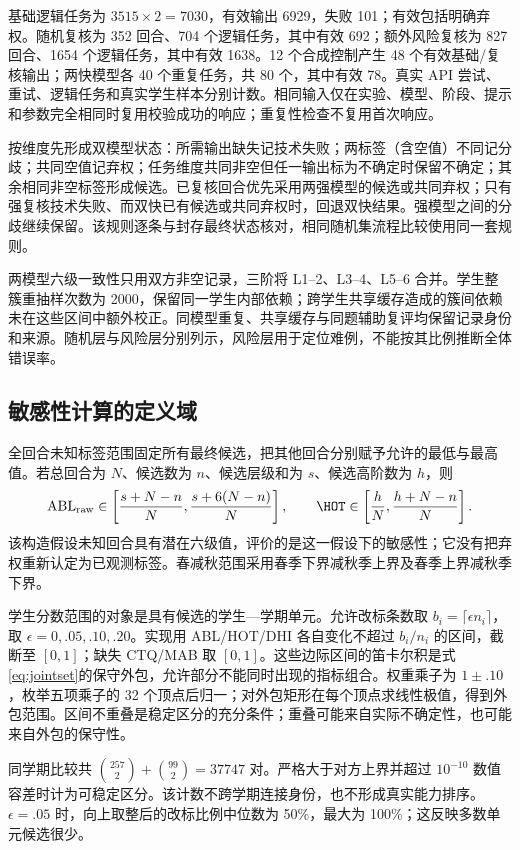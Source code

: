 基础逻辑任务为 $3515\times2=7030$，有效输出 6929，失败 101；有效包括明确弃权。随机复核为 352 回合、704 个逻辑任务，其中有效 692；额外风险复核为 827 回合、1654 个逻辑任务，其中有效 1638。12 个合成控制产生 48 个有效基础/复核输出；两快模型各 40 个重复任务，共 80 个，其中有效 78。真实 API 尝试、重试、逻辑任务和真实学生样本分别计数。相同输入仅在实验、模型、阶段、提示和参数完全相同时复用校验成功的响应；重复性检查不复用首次响应。

按维度先形成双模型状态：所需输出缺失记技术失败；两标签（含空值）不同记分歧；共同空值记弃权；任务维度共同非空但任一输出标为不确定时保留不确定；其余相同非空标签形成候选。已复核回合优先采用两强模型的候选或共同弃权；只有强复核技术失败、而双快已有候选或共同弃权时，回退双快结果。强模型之间的分歧继续保留。该规则逐条与封存最终状态核对，相同随机集流程比较使用同一套规则。

两模型六级一致性只用双方非空记录，三阶将 L1--2、L3--4、L5--6 合并。学生整簇重抽样次数为 2000，保留同一学生内部依赖；跨学生共享缓存造成的簇间依赖未在这些区间中额外校正。同模型重复、共享缓存与同题辅助复评均保留记录身份和来源。随机层与风险层分别列示，风险层用于定位难例，不能按其比例推断全体错误率。

\subsection{敏感性计算的定义域}
全回合未知标签范围固定所有最终候选，把其他回合分别赋予允许的最低与最高值。若总回合为 $N$、候选数为 $n$、候选层级和为 $s$、候选高阶数为 $h$，则
\begin{equation}
\mathrm{ABL}_{\rm raw}\in\left[\frac{s+N-n}{N},\frac{s+6(N-n)}{N}\right],\qquad
\HOT\in\left[\frac hN,\frac{h+N-n}{N}\right].
\end{equation}
该构造假设未知回合具有潜在六级值，评价的是这一假设下的敏感性；它没有把弃权重新认定为已观测标签。春减秋范围采用春季下界减秋季上界及春季上界减秋季下界。

学生分数范围的对象是具有候选的学生—学期单元。允许改标条数取 $b_i=\lceil\epsilon n_i\rceil$，取 $\epsilon=0,.05,.10,.20$。实现用 ABL/HOT/DHI 各自变化不超过 $b_i/n_i$ 的区间，截断至 $[0,1]$；缺失 CTQ/MAB 取 $[0,1]$。这些边际区间的笛卡尔积是式\eqref{eq:jointset}的保守外包，允许部分不能同时出现的指标组合。权重乘子为 $1\pm .10$，枚举五项乘子的 32 个顶点后归一；对外包矩形在每个顶点求线性极值，得到外包范围。区间不重叠是稳定区分的充分条件；重叠可能来自实际不确定性，也可能来自外包的保守性。

同学期比较共 $\binom{257}{2}+\binom{99}{2}=37747$ 对。严格大于对方上界并超过 $10^{-10}$ 数值容差时计为可稳定区分。该计数不跨学期连接身份，也不形成真实能力排序。$\epsilon=.05$ 时，向上取整后的改标比例中位数为 50\%，最大为 100\%；这反映多数单元候选很少。

